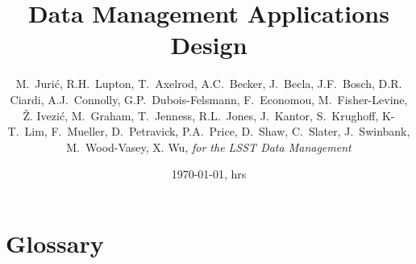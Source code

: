 \documentclass[DM,lsstdraft,toc]{lsstdoc}
\title{Data Management Applications Design}
\author{
    M.~Juri\'c,
    R.H.~Lupton, T.~Axelrod, A.C.~Becker, J.~Becla,
    J.F.~Bosch,  D.R. Ciardi,  A.J.~Connolly,  G.P.~Dubois-Felsmann,
    F.~Economou, M.~Fisher-Levine, \v{Z}. Ivezi\'c,  M.~Graham,
    T.~Jenness,  R.L.~Jones, J.~Kantor, S.~Krughoff, K-T.~Lim,
    F.~Mueller,  D.~Petravick, P.A.~Price,  D.~Shaw,  C.~Slater,
     J.~Swinbank,  M.~Wood-Vasey, X. Wu,
     {\em for the LSST Data Management}
}
\date{\today, \currenttime hrs}
\begin{document}
\maketitle
















\section{Glossary}
\end{document}
